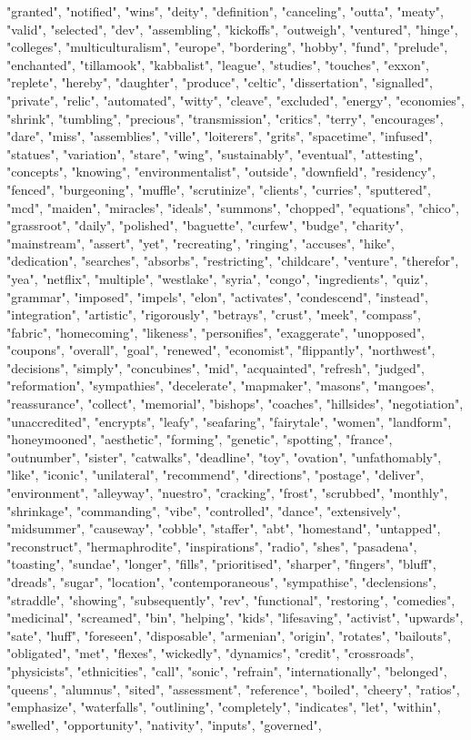 "granted", "notified", "wins", "deity", "definition", "canceling", "outta", "meaty", "valid", "selected", "dev", "assembling", "kickoffs", "outweigh", "ventured", "hinge", "colleges", "multiculturalism", "europe", "bordering", "hobby", "fund", "prelude", "enchanted", "tillamook", "kabbalist", "league", "studies", "touches", "exxon", "replete", "hereby", "daughter", "produce", "celtic", "dissertation", "signalled", "private", "relic", "automated", "witty", "cleave", "excluded", "energy", "economies", "shrink", "tumbling", "precious", "transmission", "critics", "terry", "encourages", "dare", "miss", "assemblies", "ville", "loiterers", "grits", "spacetime", "infused", "statues", "variation", "stare", "wing", "sustainably", "eventual", "attesting", "concepts", "knowing", "environmentalist", "outside", "downfield", "residency", "fenced", "burgeoning", "muffle", "scrutinize", "clients", "curries", "sputtered", "mcd", "maiden", "miracles", "ideals", "summons", "chopped", "equations", "chico", "grassroot", "daily", "polished", "baguette", "curfew", "budge", "charity", "mainstream", "assert", "yet", "recreating", "ringing", "accuses", "hike", "dedication", "searches", "absorbs", "restricting", "childcare", "venture", "therefor", "yea", "netflix", "multiple", "westlake", "syria", "congo", "ingredients", "quiz", "grammar", "imposed", "impels", "elon", "activates", "condescend", "instead", "integration", "artistic", "rigorously", "betrays", "crust", "meek", "compass", "fabric", "homecoming", "likeness", "personifies", "exaggerate", "unopposed", "coupons", "overall", "goal", "renewed", "economist", "flippantly", "northwest", "decisions", "simply", "concubines", "mid", "acquainted", "refresh", "judged", "reformation", "sympathies", "decelerate", "mapmaker", "masons", "mangoes", "reassurance", "collect", "memorial", "bishops", "coaches", "hillsides", "negotiation", "unaccredited", "encrypts", "leafy", "seafaring", "fairytale", "women", "landform", "honeymooned", "aesthetic", "forming", "genetic", "spotting", "france", "outnumber", "sister", "catwalks", "deadline", "toy", "ovation", "unfathomably", "like", "iconic", "unilateral", "recommend", "directions", "postage", "deliver", "environment", "alleyway", "nuestro", "cracking", "frost", "scrubbed", "monthly", "shrinkage", "commanding", "vibe", "controlled", "dance", "extensively", "midsummer", "causeway", "cobble", "staffer", "abt", "homestand", "untapped", "reconstruct", "hermaphrodite", "inspirations", "radio", "shes", "pasadena", "toasting", "sundae", "longer", "fills", "prioritised", "sharper", "fingers", "bluff", "dreads", "sugar", "location", "contemporaneous", "sympathise", "declensions", "straddle", "showing", "subsequently", "rev", "functional", "restoring", "comedies", "medicinal", "screamed", "bin", "helping", "kids", "lifesaving", "activist", "upwards", "sate", "huff", "foreseen", "disposable", "armenian", "origin", "rotates", "bailouts", "obligated", "met", "flexes", "wickedly", "dynamics", "credit", "crossroads", "physicists", "ethnicities", "call", "sonic", "refrain", "internationally", "belonged", "queens", "alumnus", "sited", "assessment", "reference", "boiled", "cheery", "ratios", "emphasize", "waterfalls", "outlining", "completely", "indicates", "let", "within", "swelled", "opportunity", "nativity", "inputs", "governed", 